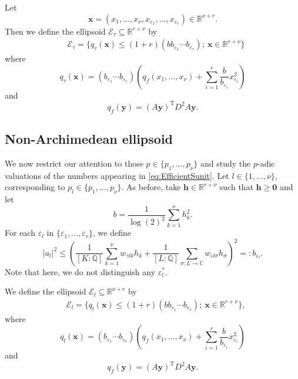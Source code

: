 Let
\[\mathbf{x} = (x_1, \dots, x_{\nu}, x_{\varepsilon_1}, \dots, x_{\varepsilon_{r}}) \in \mathbb{R}^{\nu + r}.\]
Then we define the ellipsoid $\mathcal{E_\tau}\subseteq \mathbb{R}^{r+\nu}$ by
\begin{align}\label{def:ellreal}
& \mathcal{E_\tau}=\{q_\tau(\mathbf{x})\leq (1 + r)(bb_{\varepsilon_1}\cdots b_{\varepsilon_r}); \ \mathbf{x}\in\mathbb{R}^{r+\nu}\}\end{align}
where
\[q_{\tau}(\mathbf{x})= (b_{\varepsilon_1}\cdots b_{\varepsilon_r})\left( q_f(x_1, \dots, x_{\nu}) + \sum_{i = 1}^r\frac{b}{b_{\varepsilon_i}}x_{\varepsilon_i}^2\right)\]
and
\[q_f(\mathbf{y}) = (A\mathbf{y})^{\text{T}}D^2A\mathbf{y}.\]

\subsection{Non-Archimedean ellipsoid}

We now restrict our attention to those $p \in \{p_1, \dots, p_{\nu}\}$ and study the $p$-adic valuations of the numbers appearing in \eqref{eq:EfficientSunit}. Let $l \in \{1, \dots, \nu\}$, corresponding to $p_l \in \{p_1, \dots, p_{\nu}\}$. As before, take $\mathbf{h}\in\mathbb{R}^{r+\nu}$ such that $\mathbf{h}\geq \mathbf{0}$ and let
\[b = \frac{1}{\log(2)^2}\sum_{k = 1}^{\nu} h_k^2.\]
For each $\varepsilon_l$ in $\{\varepsilon_1, \dots, \varepsilon_r\}$, we define
\[|a_l|^2 \leq \left( \frac{1}{[K:\mathbb{Q}]}\sum_{k = 1}^{\nu} w_{\gamma l k}h_k + \frac{1}{[L:\mathbb{Q}]}\sum_{\sigma:L\to \mathbb{C}} w_{\varepsilon l \sigma}h_{\sigma}\right)^2=:b_{\varepsilon_l}.\]
Note that here, we do not distinguish any $\varepsilon_l^*$. 

We define the ellipsoid $\mathcal{E}_l \subseteq \mathbb{R}^{\nu + r}$ by 
\begin{align}\label{def:ellp}
& \mathcal{E}_l=\{q_l(\mathbf{x})\leq (1 + r)(bb_{\varepsilon_1}\cdots b_{\varepsilon_r}); \ \mathbf{x}\in\mathbb{R}^{r+\nu}\},\end{align}
where
\[q_l(\mathbf{x})= (b_{\varepsilon_1}\cdots b_{\varepsilon_r})\left( q_f(x_1, \dots, x_{\nu}) + \sum_{i = 1}^r\frac{b}{b_{\varepsilon_i}}x_{\varepsilon_i}^2\right)\]
and
\[q_f(\mathbf{y}) = (A\mathbf{y})^{\text{T}}D^2A\mathbf{y}.\]

